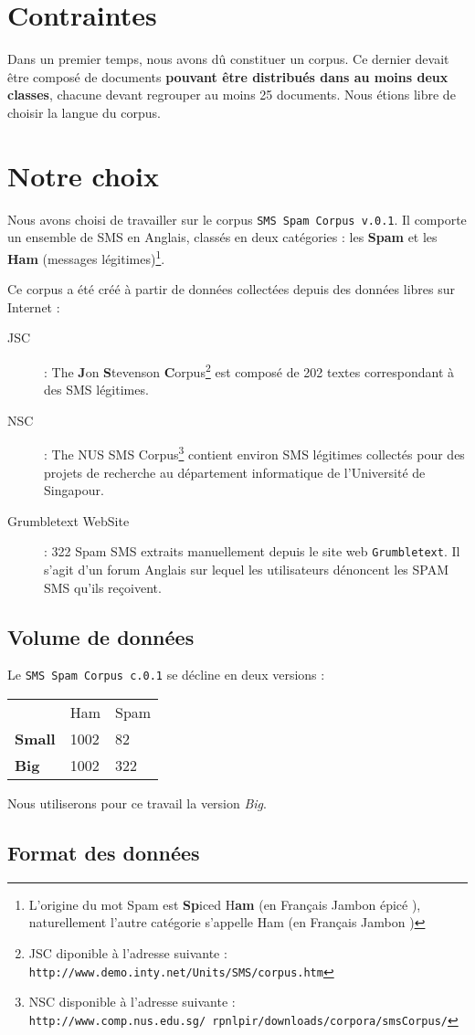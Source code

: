 \section{Contraintes}
Dans un premier temps, nous avons dû constituer un corpus. Ce dernier devait être composé de documents \textbf{pouvant être distribués dans au moins deux classes}, chacune devant regrouper au moins 25 documents. Nous étions libre de choisir la langue du corpus.

\section{Notre choix}
Nous avons choisi de travailler sur le corpus \texttt{SMS Spam Corpus v.0.1}. Il comporte un ensemble de SMS en Anglais, classés en deux catégories : les \textbf{Spam} et les \textbf{Ham} (messages légitimes)\footnote{L'origine du mot Spam est \og \textbf{Sp}iced H\textbf{am} \fg{} (en Français \og Jambon épicé \fg{}), naturellement l'autre catégorie s'appelle \og Ham \fg{} (en Français \og Jambon \fg{})}.

Ce corpus a été créé à partir de données collectées depuis des données libres sur Internet :

\begin{description}
\item[JSC] : The \textbf{J}on \textbf{S}tevenson \textbf{C}orpus\footnote{JSC diponible à l'adresse suivante : \texttt{http://www.demo.inty.net/Units/SMS/corpus.htm}} est composé de 202 textes correspondant à des SMS légitimes.
\item[NSC] : The NUS SMS Corpus\footnote{NSC disponible à l'adresse suivante : \texttt{http://www.comp.nus.edu.sg/~rpnlpir/downloads/corpora/smsCorpus/}} contient environ  SMS légitimes collectés pour des projets de recherche au département informatique de l'Université de Singapour.
\item[Grumbletext WebSite] : 322 Spam SMS extraits manuellement depuis le site web \texttt{Grumbletext}. Il s'agit d'un forum Anglais sur lequel les utilisateurs dénoncent les SPAM SMS qu'ils reçoivent.
\end{description}

\subsection*{Volume de données}

Le \texttt{SMS Spam Corpus c.0.1} se décline en deux versions : 

\nopagebreak
\begin{tabular}{p{3cm} p{4cm} p{4cm}}
 & Ham & Spam \\
\textbf{Small} & 1002 & 82 \\
\textbf{Big} & 1002 & 322 \\
\end{tabular}

Nous utiliserons pour ce travail la version \textit{Big}.

\subsection*{Format des données}

